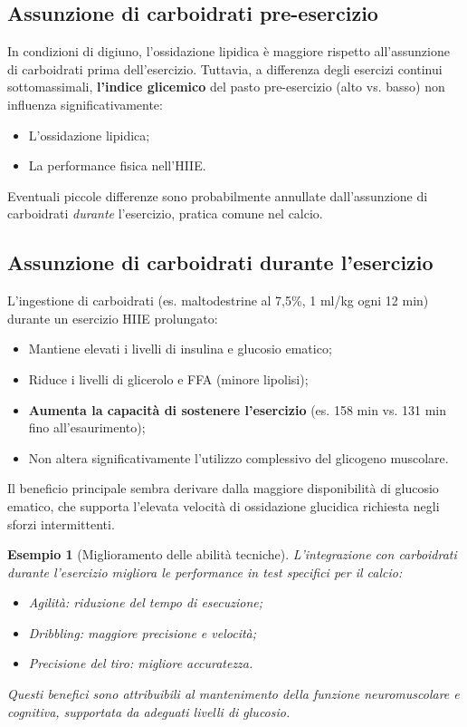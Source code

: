 \documentclass[12pt,a4paper]{report}
\newtheorem{esempio}{Esempio}[section]
\begin{document}
\subsection{Assunzione di carboidrati pre-esercizio}
In condizioni di digiuno, l'ossidazione lipidica è maggiore rispetto all'assunzione di carboidrati prima dell'esercizio. Tuttavia, a differenza degli esercizi continui sottomassimali, \textbf{l'indice glicemico} del pasto pre-esercizio (alto vs. basso) non influenza significativamente:
\begin{itemize}
\item L'ossidazione lipidica;
\item La performance fisica nell'HIIE.
\end{itemize}
Eventuali piccole differenze sono probabilmente annullate dall'assunzione di carboidrati \textit{durante} l'esercizio, pratica comune nel calcio.
\subsection{Assunzione di carboidrati durante l'esercizio}
L'ingestione di carboidrati (es. maltodestrine al 7,5\%, 1 ml/kg ogni 12 min) durante un esercizio HIIE prolungato:
\begin{itemize}
\item Mantiene elevati i livelli di insulina e glucosio ematico;
\item Riduce i livelli di glicerolo e FFA (minore lipolisi);
\item \textbf{Aumenta la capacità di sostenere l'esercizio} (es. 158 min vs. 131 min fino all'esaurimento);
\item Non altera significativamente l'utilizzo complessivo del glicogeno muscolare.
\end{itemize}
Il beneficio principale sembra derivare dalla maggiore disponibilità di glucosio ematico, che supporta l'elevata velocità di ossidazione glucidica richiesta negli sforzi intermittenti.
\begin{esempio}[Miglioramento delle abilità tecniche]
L'integrazione con carboidrati durante l'esercizio migliora le performance in test specifici per il calcio:
\begin{itemize}
\item Agilità: riduzione del tempo di esecuzione;
\item Dribbling: maggiore precisione e velocità;
\item Precisione del tiro: migliore accuratezza.
\end{itemize}
Questi benefici sono attribuibili al mantenimento della funzione neuromuscolare e cognitiva, supportata da adeguati livelli di glucosio.
\end{esempio}
\end{document}
